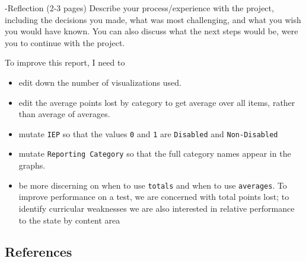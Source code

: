 \documentclass[
  letterpaper,
  DIV=11,
  numbers=noendperiod]{scrartcl}
\providecommand{\tightlist}{%
  \setlength{\itemsep}{0pt}\setlength{\parskip}{0pt}}\usepackage{longtable,booktabs,array}
\begin{document}
-Reflection (2-3 pages) Describe your process/experience with the
project, including the decisions you made, what was most challenging,
and what you wish you would have known. You can also discuss what the
next steps would be, were you to continue with the project.

To improve this report, I need to

\begin{itemize}
\tightlist
\item
  edit down the number of visualizations used.
\item
  edit the average points lost by category to get average over all
  items, rather than average of averages.
\item
  mutate \texttt{IEP} so that the values \texttt{0} and \texttt{1} are
  \texttt{Disabled} and \texttt{Non-Disabled}
\item
  mutate \texttt{Reporting\ Category} so that the full category names
  appear in the graphs.
\item
  be more discerning on when to use \texttt{totals} and when to use
  \texttt{averages}. To improve performance on a test, we are concerned
  with total points lost; to identify curricular weaknesses we are also
  interested in relative performance to the state by content area
\end{itemize}

\hypertarget{references}{%
\subsection{References}\label{references}}
\end{document}

